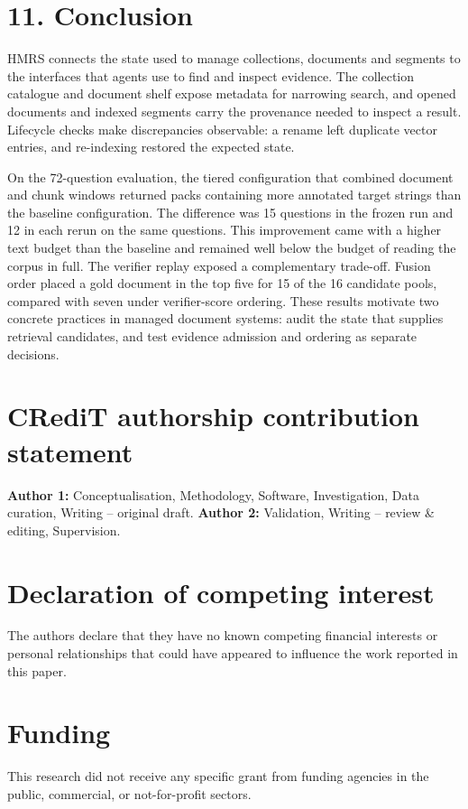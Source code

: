 \section{11. Conclusion}


HMRS connects the state used to manage collections, documents and segments
to the interfaces that agents use to find and inspect evidence. The
collection catalogue and document shelf expose metadata for narrowing
search, and opened documents and indexed segments carry the provenance
needed to inspect a result. Lifecycle checks make discrepancies observable:
a rename left duplicate vector entries, and re-indexing restored the expected
state.

On the 72-question evaluation, the tiered configuration that combined
document and chunk windows returned packs containing more annotated target
strings than the baseline configuration. The difference was 15 questions in the
frozen run and 12 in each rerun on the same questions.
This improvement came with a higher text budget than the baseline and
remained well below the budget of reading the corpus in full. The verifier
replay exposed a complementary trade-off. Fusion order placed a gold
document in the top five for 15 of the 16 candidate pools, compared with
seven under verifier-score ordering.
These results motivate two concrete practices in managed document systems:
audit the state that supplies retrieval candidates, and test evidence
admission and ordering as separate decisions.



\section*{CRediT authorship contribution statement}
\textbf{Author 1:} Conceptualisation, Methodology, Software, Investigation,
Data curation, Writing -- original draft. \textbf{Author 2:} Validation,
Writing -- review \& editing, Supervision. 
\section*{Declaration of competing interest}
The authors declare that they have no known competing financial interests
or personal relationships that could have appeared to influence the work
reported in this paper.

\section*{Funding}
This research did not receive any specific grant from funding agencies in
the public, commercial, or not-for-profit sectors. 
